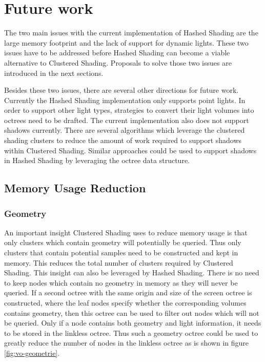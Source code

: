 \section{Future work}

The two main issues with the current implementation of Hashed Shading are the large memory
footprint and the lack of support for dynamic lights. These two issues have to be addressed
before Hashed Shading can become a viable alternative to Clustered Shading. Proposals
to solve those two issues are introduced in the next sections.

Besides these two issues, there are several other directions for future work. Currently
the Hashed Shading implementation only supports point lights. In order to support
other light types, strategies to convert their light volumes into octrees need to be
drafted. The current implementation also does not support shadows currently. There
are several algorithms which leverage the clustered shading clusters to reduce
the amount of work required to support shadows within Clustered Shading\cite{Olsson:2014:EVS:2556700.2556701, kampe2016fast}.
Similar approaches could be used to support shadows in Hashed Shading by leveraging
the octree data structure.


\subsection{Memory Usage Reduction}
\subsubsection{Geometry}



An important insight Clustered Shading uses to reduce memory usage is that only clusters
which contain geometry will potentially be queried. Thus only clusters that contain potential
samples need to be constructed and kept in memory. This reduces the total number of clusters
required by Clustered Shading. This insight can also be leveraged by Hashed Shading. There
is no need to keep nodes which contain no geometry in memory as they will never be queried.
If a second octree with the same origin and size of the screen octree is constructed, where
the leaf nodes specify whether the corresponding volumes contains geometry, then this octree
can be used to filter out nodes which will not be queried. Only if a node contains both
geometry and light information, it needs to be stored in the linkless octree. Thus such
a geometry octree could be used to greatly reduce the number of nodes in the linkless octree as
is shown in figure \ref{fig:vo-geometrie}.

